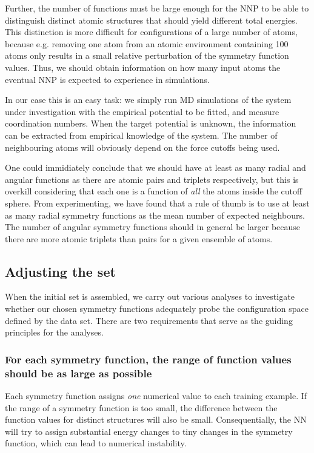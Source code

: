 \documentclass[twoside,english]{uiofysmaster}
\begin{document}
Further, the number of functions must be large enough for the NNP to be able to distinguish distinct atomic structures that
should yield different total energies. This distinction is more difficult for configurations of a large number of atoms, because
e.g. removing one atom from an atomic environment containing 100 atoms only results in a small relative 
perturbation of the symmetry function values. Thus, we should obtain information on how many input atoms 
the eventual NNP is expected to experience in simulations. 

In our case this is an easy task: we simply run MD simulations 
of the system under investigation with the empirical potential to be fitted, and measure coordination numbers. When the 
target potential is unknown, the information can be extracted from empirical knowledge of the system. The number of 
neighbouring atoms will obviously depend on the force cutoffs being used. 

One could immidiately conclude that we
should have at least as many radial and angular functions as there are atomic pairs and triplets respectively, but this is overkill
considering that each one is a function of \textit{all} the atoms inside the cutoff sphere.
From experimenting, we have found that a rule of thumb is to use at least as many radial symmetry functions
as the mean number of expected neighbours. The number of angular symmetry functions should in general be larger because
there are more atomic triplets than pairs for a given ensemble of atoms.  


\subsection{Adjusting the set} \label{sec:adjustSymmSet}
When the initial set is assembled, we carry out various analyses to investigate whether our chosen symmetry functions 
adequately probe the configuration space defined by the data set. There are two requirements
that serve as the guiding principles for the analyses.

\subsubsection{For each symmetry function, the range of function values should be as large as possible}
Each symmetry function
assigns \textit{one} numerical value to each training example. If the range of a symmetry function is too small, 
the difference between the function values for distinct structures will also be small. Consequentially, 
the NN will try to assign substantial energy changes to tiny changes in the symmetry function, which 
can lead to numerical instability. 
\end{document}
